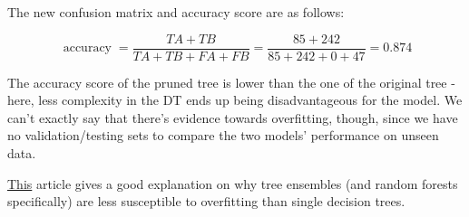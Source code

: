 \documentclass[12pt]{article}
\begin{document}
\begin{enumerate}[leftmargin=\labelsep]
        \begin{figure}[H]
          \centering
          
        \end{figure}

        The new confusion matrix and accuracy score are as follows:

        \begin{figure}[H]
          \centering
          
        \end{figure}

        \begin{equation*}
          \operatorname{accuracy} = \frac{TA + TB}{TA + TB + FA + FB} = \frac{85 + 242}{85 + 242 + 0 + 47} = 0.874
        \end{equation*}

        The accuracy score of the pruned tree is lower than the one of the original
        tree - here, less complexity in the DT ends up being disadvantageous for the
        model. We can't exactly say that there's evidence towards overfitting, though,
        since we have no validation/testing sets to compare the two models' performance
        on unseen data.

        \href{https://towardsdatascience.com/basic-ensemble-learning-random-forest-adaboost-gradient-boosting-step-by-step-explained-95d49d1e2725}{This}
        article gives a good explanation on why tree ensembles (and random forests
        specifically) are less susceptible to overfitting than single decision trees.

\end{enumerate}
\end{document}
